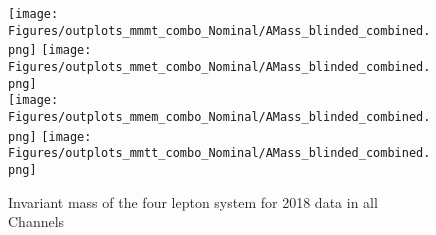 
\begin{figure}[ht!b]
  \centering
  \texttt{[image: Figures/outplots\_mmmt\_combo\_Nominal/AMass\_blinded\_combined.png]}
  \texttt{[image: Figures/outplots\_mmet\_combo\_Nominal/AMass\_blinded\_combined.png]}\\
  \texttt{[image: Figures/outplots\_mmem\_combo\_Nominal/AMass\_blinded\_combined.png]}
  \texttt{[image: Figures/outplots\_mmtt\_combo\_Nominal/AMass\_blinded\_combined.png]}\\
    \caption{\label{fig:AMass_v1} Invariant mass of the four lepton system for 2018 data in all Channels}
\end{figure}

